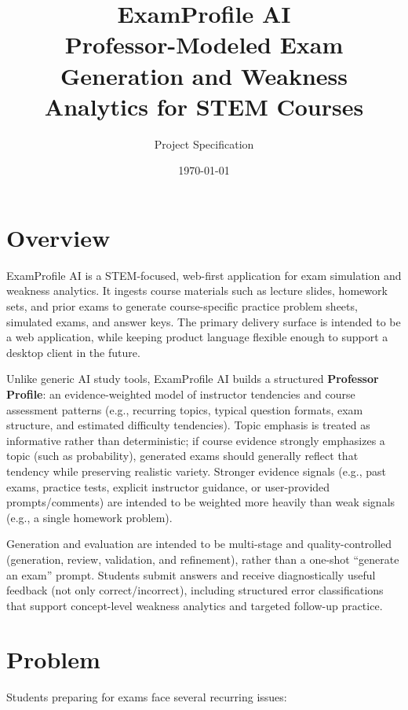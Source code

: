 \documentclass[11pt]{article}
\title{ExamProfile AI \\ \large Professor-Modeled Exam Generation and Weakness Analytics for STEM Courses}
\author{Project Specification}
\date{\today}
\begin{document}
\maketitle
\tableofcontents
\newpage

\section{Overview}
ExamProfile AI is a STEM-focused, web-first application for exam simulation and weakness analytics. It ingests course materials such as lecture slides, homework sets, and prior exams to generate course-specific practice problem sheets, simulated exams, and answer keys. The primary delivery surface is intended to be a web application, while keeping product language flexible enough to support a desktop client in the future.

Unlike generic AI study tools, ExamProfile AI builds a structured \textbf{Professor Profile}: an evidence-weighted model of instructor tendencies and course assessment patterns (e.g., recurring topics, typical question formats, exam structure, and estimated difficulty tendencies). Topic emphasis is treated as informative rather than deterministic; if course evidence strongly emphasizes a topic (such as probability), generated exams should generally reflect that tendency while preserving realistic variety. Stronger evidence signals (e.g., past exams, practice tests, explicit instructor guidance, or user-provided prompts/comments) are intended to be weighted more heavily than weak signals (e.g., a single homework problem).

Generation and evaluation are intended to be multi-stage and quality-controlled (generation, review, validation, and refinement), rather than a one-shot ``generate an exam'' prompt. Students submit answers and receive diagnostically useful feedback (not only correct/incorrect), including structured error classifications that support concept-level weakness analytics and targeted follow-up practice.

\section{Problem}
Students preparing for exams face several recurring issues:
\end{document}
